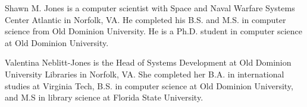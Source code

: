 \documentclass[10pt,journal,compsoc]{IEEEtran}
\begin{document}

\begin{IEEEbiographynophoto}{Shawn M. Jones}
is a computer scientist with Space and Naval Warfare Systems Center Atlantic in Norfolk, VA. He completed his B.S. and M.S. in computer science from Old Dominion University. He is a Ph.D. student in computer science at Old Dominion University.
\end{IEEEbiographynophoto}


\begin{IEEEbiographynophoto}{Valentina Neblitt-Jones}
is the Head of Systems Development at Old Dominion University Libraries in Norfolk, VA. She completed her B.A. in international studies at Virginia Tech, B.S. in computer science at Old Dominion University, and M.S in library science at Florida State University.
\end{IEEEbiographynophoto}






\end{document}
